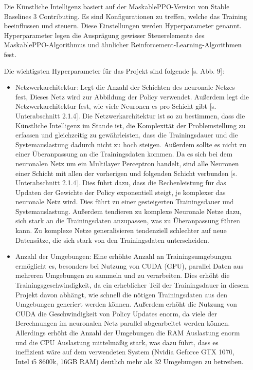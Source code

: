 Die Künstliche Intelligenz basiert auf der MaskablePPO-Version von Stable Baselines 3 Contributing. Es sind Konfigurationen zu treffen, welche das Training beeinflussen und steuern. Diese Einstellungen werden Hyperparameter genannt. Hyperparameter legen die Ausprägung gewisser Steuerelemente des MaskablePPO-Algorithmus und ähnlicher Reinforcement-Learning-Algorithmen fest.

Die wichtigsten Hyperparameter für das Projekt sind folgende [s. Abb. 9]:

\begin{itemize} 
\item Netzwerkarchitektur: Legt die Anzahl der Schichten des neuronale Netzes fest, Dieses Netz wird zur Abbildung der Policy verwendet. Außerdem legt die Netzwerkarchitektur fest, wie viele Neuronen es pro Schicht gibt [s. Unterabschnitt 2.1.4]. Die Netzwerkarchitektur ist so zu bestimmen, dass die Künstliche Intelligenz im Stande ist, die Komplexität der Problemstellung zu erfassen und gleichzeitig zu gewährleisten, dass die Trainingsdauer und die Systemauslastung dadurch nicht zu hoch steigen. Außerdem sollte es nicht zu einer Überanpassung an die Trainingsdaten kommen. Da es sich bei dem neuronalen Netz um ein Multilayer Perceptron handelt, sind alle Neuronen einer Schicht mit allen der vorherigen und folgenden Schicht verbunden [s. Unterabschnitt 2.1.4]. Dies führt dazu, dass die Rechenleistung für das Updaten der Gewichte der Policy exponentiell steigt, je komplexer das neuronale Netz wird. Dies führt zu einer gesteigerten Trainingsdauer und Systemauslastung. Außerdem tendieren zu komplexe Neuronale Netze dazu, sich stark an die Trainingsdaten anzupassen, was zu Überanpassung führen kann. Zu komplexe Netze generalisieren tendenziell schlechter auf neue Datensätze, die sich stark von den Trainingsdaten unterscheiden.

\item Anzahl der Umgebungen: Eine erhöhte Anzahl an Trainingsumgebungen ermöglicht es, besonders bei Nutzung von CUDA (GPU), parallel Daten aus mehreren Umgebungen zu sammeln und zu verarbeiten. Dies erhöht die Trainingsgeschwindigkeit, da ein erheblicher Teil der Trainingsdauer in diesem Projekt davon abhängt, wie schnell die nötigen Trainingsdaten aus den Umgebungen generiert werden können. Außerdem erhöht die Nutzung von CUDA die Geschwindigkeit von Policy Updates enorm, da viele der Berechnungen im neuronalen Netz parallel abgearbeitet werden können. Allerdings erhöht die Anzahl der Umgebungen die RAM Auslastung enorm und die CPU Auslastung mittelmäßig stark, was dazu führt, dass es ineffizient wäre auf dem verwendeten System (Nvidia Geforce GTX 1070, Intel i5 8600k, 16GB RAM) deutlich mehr als 32 Umgebungen zu betreiben.


\end{itemize}
